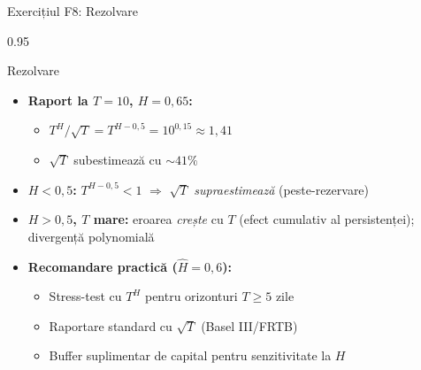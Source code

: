 \documentclass[9pt, aspectratio=169, t]{beamer}
\begin{document}
\begin{frame}[shrink=25]{Exercițiul F8: Rezolvare}
\begin{cminipage}{0.95\textwidth}
\begin{exampleblock}{Rezolvare}
\begin{itemize}\setlength{\itemsep}{0pt}
    \item \textbf{Raport la $T = 10$, $H = 0{,}65$:}
    \begin{itemize}\setlength{\itemsep}{0pt}
        \item $T^H/\sqrt T = T^{H - 0{,}5} = 10^{0{,}15} \approx 1{,}41$
        \item $\sqrt T$ subestimează cu $\sim 41\%$
    \end{itemize}
    \item \textbf{$H < 0{,}5$:} $T^{H-0{,}5} < 1$ $\Rightarrow$ $\sqrt T$ \emph{supraestimează} (peste-rezervare)
    \item \textbf{$H > 0{,}5$, $T$ mare:} eroarea \emph{crește} cu $T$ (efect cumulativ al persistenței); divergență polynomială
    \item \textbf{Recomandare practică ($\hat H = 0{,}6$):}
    \begin{itemize}\setlength{\itemsep}{0pt}
        \item Stress-test cu $T^H$ pentru orizonturi $T \ge 5$ zile
        \item Raportare standard cu $\sqrt T$ (Basel III/FRTB)
        \item Buffer suplimentar de capital pentru senzitivitate la $H$
    \end{itemize}
\end{itemize}
\end{exampleblock}
\end{cminipage}
\end{frame}
\end{document}
